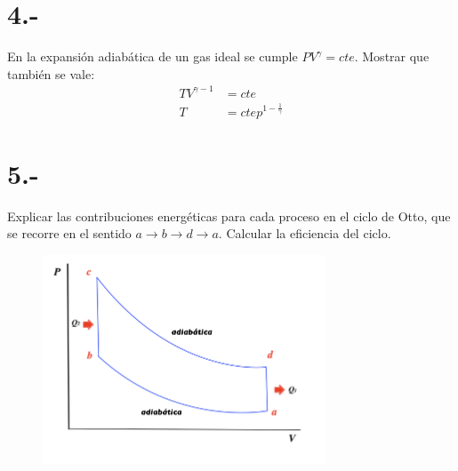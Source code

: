 \documentclass{article}
\begin{document}
\section*{4.-}
En la expansión adiabática de un gas ideal se cumple $PV^{\gamma} = cte$. Mostrar que también 
se vale:
\begin{align*}
    TV^{\gamma -1} &= cte \\
    T &= cte p^{1-\frac{1}{\gamma}}
\end{align*}
\begin{tcolorbox}[breakable]
    
\end{tcolorbox}
\section*{5.-}
Explicar las contribuciones energéticas para cada proceso en el ciclo de Otto, que se 
recorre en el sentido $a \to b \to d \to a$. Calcular la eficiencia del ciclo.
\begin{figure}[H]
    \centering
    \includegraphics{images/p5_cycle.png}
\end{figure}
\begin{tcolorbox}[breakable]
    
\end{tcolorbox}
\end{document}
